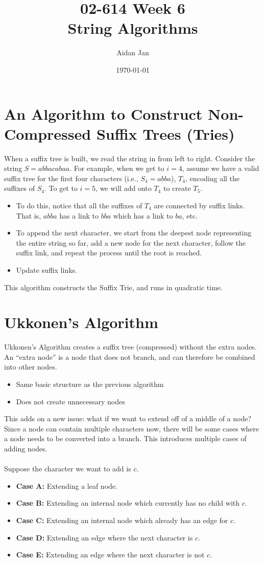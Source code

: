 \documentclass[10pt]{article}
\title{02-614 Week 6 \\ \large{String Algorithms}}
\author{Aidan Jan}
\date{\today}
\begin{document}
\maketitle

\section*{An Algorithm to Construct Non-Compressed Suffix Trees (Tries)}
When a suffix tree is built, we read the string in from left to right.  Consider the string $S = abbacabaa$.  For example, when we get to $i = 4$, assume we have a valid suffix tree for the first four characters (i.e., $S_4 = abba$), $T_4$, encoding all the suffixes of $S_4$.  To get to $i = 5$, we will add onto $T_4$ to create $T_5$.
\begin{itemize}
	\item To do this, notice that all the suffixes of $T_4$ are connected by suffix links.  That is, $abba$ has a link to $bba$ which has a link to $ba$, etc.
	\item To append the next character, we start from the deepest node representing the entire string so far, add a new node for the next character, follow the suffix link, and repeat the process until the root is reached.
	\item Update suffix links.
\end{itemize}
This algorithm constructs the Suffix Trie, and runs in quadratic time.

\section*{Ukkonen's Algorithm}
Ukkonen's Algorithm creates a suffix tree (compressed) without the extra nodes.  An ``extra node'' is a node that does not branch, and can therefore be combined into other nodes.
\begin{itemize}
	\item Same basic structure as the previous algorithm
	\item Does not create unnecessary nodes
\end{itemize}
This adds on a new issue: what if we want to extend off of a middle of a node?  Since a node can contain multiple characters now, there will be some cases where a node needs to be converted into a branch.  This introduces multiple cases of adding nodes.\\\\
Suppose the character we want to add is $c$.
\begin{itemize}
	\item \textbf{Case A:} Extending a leaf node.
	\item \textbf{Case B:} Extending an internal node which currently has no child with $c$.
	\item \textbf{Case C:} Extending an internal node which already has an edge for $c$.
	\item \textbf{Case D:} Extending an edge where the next character is $c$.
	\item \textbf{Case E:} Extending an edge where the next character is not $c$.
\end{itemize}
\end{document}
